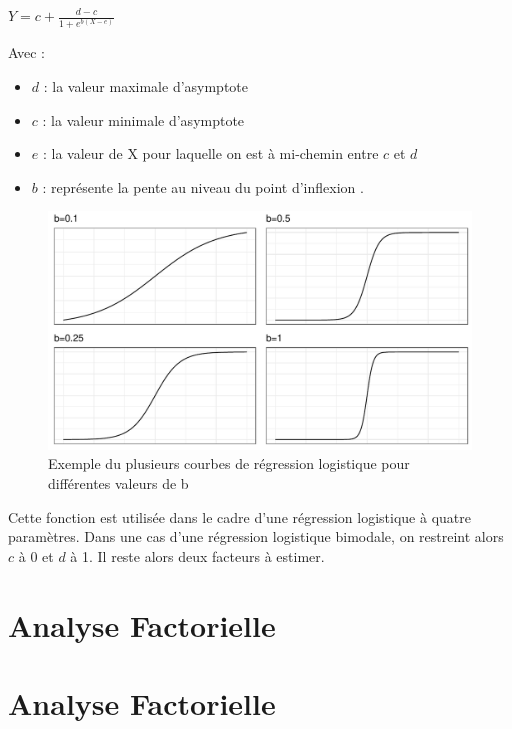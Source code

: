 \documentclass[
]{article}
\providecommand{\tightlist}{%
  \setlength{\itemsep}{0pt}\setlength{\parskip}{0pt}}
\begin{document}
\(Y=c+\frac{d-c}{1+e^{b(X-e)}}\)

Avec :

\begin{itemize}
\tightlist
\item
  \(d\) : la valeur maximale d'asymptote
\item
  \(c\) : la valeur minimale d'asymptote
\item
  \(e\) : la valeur de X pour laquelle on est à mi-chemin entre \(c\) et
  \(d\)
\item
  \(b\) : représente la pente au niveau du point d'inflexion .
\end{itemize}

\begin{figure}
\centering
\includegraphics{Learning_R_files/figure-latex/unnamed-chunk-12-1.pdf}
\caption{Exemple du plusieurs courbes de régression logistique pour
différentes valeurs de b}
\end{figure}

Cette fonction est utilisée dans le cadre d'une régression logistique à
quatre paramètres. Dans une cas d'une régression logistique bimodale, on
restreint alors \(c\) à 0 et \(d\) à 1. Il reste alors deux facteurs à
estimer.

\pagebreak

\hypertarget{analyse-factorielle}{%
\section{Analyse Factorielle}\label{analyse-factorielle}}

\hypertarget{analyse-factorielle-1}{%
\section{Analyse Factorielle}\label{analyse-factorielle-1}}
\end{document}
